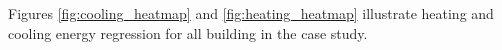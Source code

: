 Figures \ref{fig:cooling_heatmap} and \ref{fig:heating_heatmap} illustrate heating and cooling energy regression for all building in the case study.